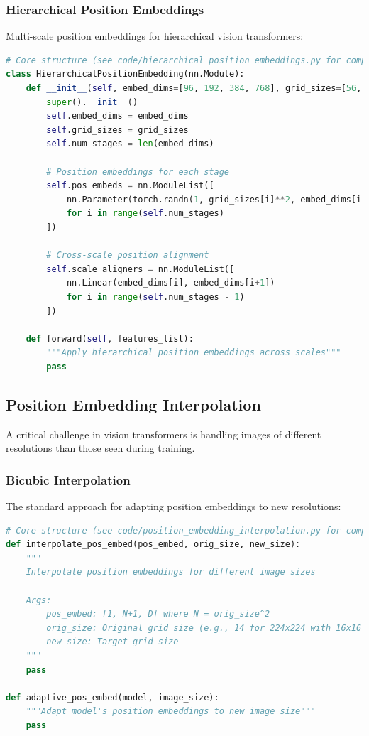 \subsubsection{Hierarchical Position Embeddings}

Multi-scale position embeddings for hierarchical vision transformers:

\begin{lstlisting}[language=Python, caption=Hierarchical position embeddings]
# Core structure (see code/hierarchical_position_embeddings.py for complete implementation)
class HierarchicalPositionEmbedding(nn.Module):
    def __init__(self, embed_dims=[96, 192, 384, 768], grid_sizes=[56, 28, 14, 7]):
        super().__init__()
        self.embed_dims = embed_dims
        self.grid_sizes = grid_sizes
        self.num_stages = len(embed_dims)
        
        # Position embeddings for each stage
        self.pos_embeds = nn.ModuleList([
            nn.Parameter(torch.randn(1, grid_sizes[i]**2, embed_dims[i]) * 0.02)
            for i in range(self.num_stages)
        ])
        
        # Cross-scale position alignment
        self.scale_aligners = nn.ModuleList([
            nn.Linear(embed_dims[i], embed_dims[i+1])
            for i in range(self.num_stages - 1)
        ])
    
    def forward(self, features_list):
        """Apply hierarchical position embeddings across scales"""
        pass
\end{lstlisting}

\subsection{Position Embedding Interpolation}

A critical challenge in vision transformers is handling images of different resolutions than those seen during training.

\subsubsection{Bicubic Interpolation}

The standard approach for adapting position embeddings to new resolutions:

\begin{lstlisting}[language=Python, caption=Position embedding interpolation for different resolutions]
# Core structure (see code/position_embedding_interpolation.py for complete implementation)
def interpolate_pos_embed(pos_embed, orig_size, new_size):
    """
    Interpolate position embeddings for different image sizes
    
    Args:
        pos_embed: [1, N+1, D] where N = orig_size^2
        orig_size: Original grid size (e.g., 14 for 224x224 with 16x16 patches)
        new_size: Target grid size
    """
    pass

def adaptive_pos_embed(model, image_size):
    """Adapt model's position embeddings to new image size"""
    pass
\end{lstlisting}

